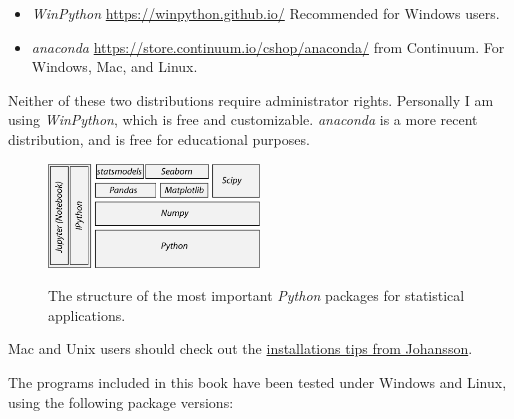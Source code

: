 \begin{itemize}
    \item \emph{WinPython} \url{https://winpython.github.io/} Recommended for Windows users.
    \item \emph{anaconda} \url{https://store.continuum.io/cshop/anaconda/} from Continuum. For Windows, Mac, and Linux.
\end{itemize}

Neither of these two distributions require administrator rights. Personally I am using \emph{WinPython}, which is free and customizable. \emph{anaconda} is a more recent distribution, and is free for educational purposes.

\begin{figure}[ht]
  \centering
  \includegraphics[width=0.5\textwidth]{../Images/ScientificPython.jpg}\\
  \caption{The structure of the most important \emph{Python} packages for statistical applications.}
  \label{fig:scientificPython}
\end{figure}

Mac and Unix users should check out the \href{https://github.com/jrjohansson/scientific-python-lectures}{installations tips from Johansson}.

The programs included in this book have been tested under Windows and Linux, using the following package versions:

